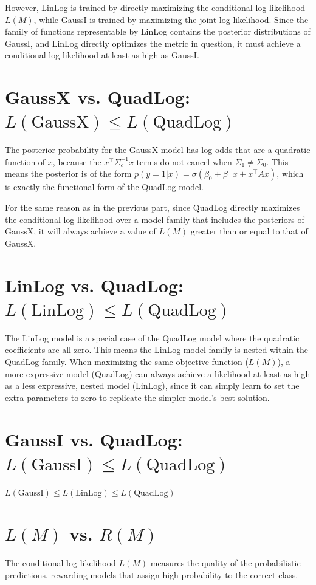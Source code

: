\documentclass[11pt, a4paper, oneside]{memoir}
\begin{document}
However, LinLog is trained by directly maximizing the conditional log-likelihood $L(M)$, while GaussI is trained by maximizing the joint log-likelihood.
Since the family of functions representable by LinLog contains the posterior distributions of GaussI,
and LinLog directly optimizes the metric in question,
it must achieve a conditional log-likelihood at least as high as GaussI.

\section[GaussX vs. QuadLog]{GaussX vs. QuadLog: $L(\text{GaussX}) \le L(\text{QuadLog})$}
The posterior probability for the GaussX model has log-odds that are a quadratic function of $x$,
because the $x^\top \Sigma_c^{-1} x$ terms do not cancel when $\Sigma_1 \neq \Sigma_0$.
This means the posterior is of the form $p(y=1|x) = \sigma(\beta_0 + \beta^\top x + x^\top A x)$,
which is exactly the functional form of the QuadLog model.

For the same reason as in the previous part,
since QuadLog directly maximizes the conditional log-likelihood over a model family that includes the posteriors of GaussX,
it will always achieve a value of $L(M)$ greater than or equal to that of GaussX.

\section[LinLog vs. QuadLog]{LinLog vs. QuadLog: $L(\text{LinLog}) \le L(\text{QuadLog})$}
The LinLog model is a special case of the QuadLog model where the quadratic coefficients are all zero.
This means the LinLog model family is nested within the QuadLog family.
When maximizing the same objective function ($L(M)$),
a more expressive model (QuadLog) can always achieve a likelihood at least as high as a less expressive, nested model (LinLog),
since it can simply learn to set the extra parameters to zero to replicate the simpler model's best solution.

\section[GaussI vs. QuadLog]{GaussI vs. QuadLog: $L(\text{GaussI}) \le L(\text{QuadLog})$}
$L(\text{GaussI}) \le L(\text{LinLog}) \le L(\text{QuadLog})$

\section[L(M) vs R(M)]{$L(M)$ vs. $R(M)$}
The conditional log-likelihood $L(M)$ measures the quality of the probabilistic predictions,
rewarding models that assign high probability to the correct class.
\end{document}
